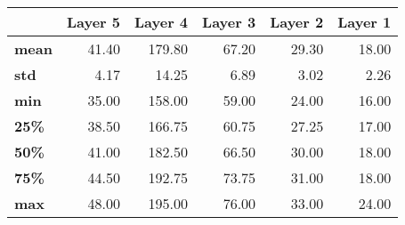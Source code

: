 \begin{tabular}{lrrrrr}
\toprule
{} &  Layer 5 &  Layer 4 &  Layer 3 &  Layer 2 &  Layer 1 \\
\midrule
\textbf{mean} &    41.40 &   179.80 &    67.20 &    29.30 &    18.00 \\
\textbf{std } &     4.17 &    14.25 &     6.89 &     3.02 &     2.26 \\
\textbf{min } &    35.00 &   158.00 &    59.00 &    24.00 &    16.00 \\
\textbf{25\% } &    38.50 &   166.75 &    60.75 &    27.25 &    17.00 \\
\textbf{50\% } &    41.00 &   182.50 &    66.50 &    30.00 &    18.00 \\
\textbf{75\% } &    44.50 &   192.75 &    73.75 &    31.00 &    18.00 \\
\textbf{max } &    48.00 &   195.00 &    76.00 &    33.00 &    24.00 \\
\bottomrule
\end{tabular}
